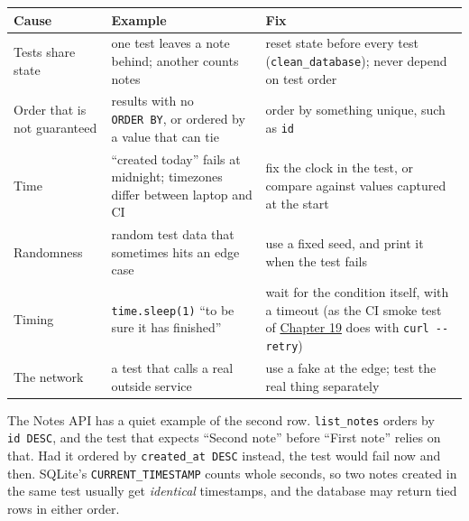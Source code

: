 {\def\LTcaptype{none} %
\begin{longtable}[]{@{}
  >{\raggedright\arraybackslash}p{}
  >{\raggedright\arraybackslash}p{}
  >{\raggedright\arraybackslash}p{}@{}}
\toprule\noalign{}
\begin{minipage}[b]{\linewidth}\raggedright
Cause
\end{minipage} & \begin{minipage}[b]{\linewidth}\raggedright
Example
\end{minipage} & \begin{minipage}[b]{\linewidth}\raggedright
Fix
\end{minipage} \\
\midrule\noalign{}
\endhead
\bottomrule\noalign{}
\endlastfoot
Tests share state & one test leaves a note behind; another counts notes & reset state before every test (\texttt{clean\_database}); never depend on test order \\
Order that is not guaranteed & results with no \texttt{ORDER\ BY}, or ordered by a value that can tie & order by something unique, such as \texttt{id} \\
Time & ``created today'' fails at midnight; timezones differ between laptop and CI & fix the clock in the test, or compare against values captured at the start \\
Randomness & random test data that sometimes hits an edge case & use a fixed seed, and print it when the test fails \\
Timing & \texttt{time.sleep(1)} ``to be sure it has finished'' & wait for the condition itself, with a timeout (as the CI smoke test of \hyperref[ch:19-artifact-storage]{Chapter 19} does with \texttt{curl\ -\/-retry}) \\
The network & a test that calls a real outside service & use a fake at the edge; test the real thing separately \\
\end{longtable}
}

The Notes API has a quiet example of the second row. \texttt{list\_notes} orders by \texttt{id\ DESC}, and the test that expects ``Second note'' before ``First note'' relies on that. Had it ordered by \texttt{created\_at\ DESC} instead, the test would fail now and then. SQLite's \texttt{CURRENT\_TIMESTAMP} counts whole seconds, so two notes created in the same test usually get \emph{identical} timestamps, and the database may return tied rows in either order.

